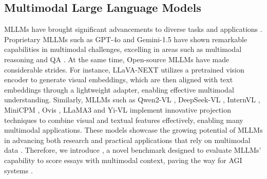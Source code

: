 \subsection{Multimodal Large Language Models}
MLLMs have brought significant advancements to diverse tasks and applications \cite{xi2023rise,huo2024mmneuron,yan2024urbanclip,yan2024georeasoner,zou2025deep,dang2024explainable}. Proprietary MLLMs such as GPT-4o \cite{openai2024gpt4ocard} and Gemini-1.5 \cite{gemini} have shown remarkable capabilities in multimodal challenges, excelling in areas such as multimodal reasoning and QA \cite{chang2024survey,yan2024errorradar,yan2024survey,zheng2024reefknot,yan2025position}. At the same time, Open-source MLLMs have made considerable strides. For instance, LLaVA-NEXT \cite{liu2024llavanext} utilizes a pretrained vision encoder to generate visual embeddings, which are then aligned with text embeddings through a lightweight adapter, enabling effective multimodal understanding. Similarly, MLLMs such as Qwen2-VL \cite{qwen2vl}, DeepSeek-VL \cite{lu2024deepseek}, InternVL \cite{internvl2,internvl2.5}, MiniCPM \cite{hu2024minicpmunveilingpotentialsmall}, Ovis \cite{lu2024ovisstructuralembeddingalignment}, LLaMA3 \cite{grattafiori2024llama3herdmodels} and Yi-VL \cite{young2024yi} implement innovative projection techniques to combine visual and textual features effectively, enabling many multimodal applications. These models showcase the growing potential of MLLMs in advancing both research and practical applications that rely on multimodal data \cite{qu2025tool,zou2024look,zhou2024mitigating,huang2024miner}. Therefore, we introduce \dataset, a novel benchmark designed to evaluate MLLMs’ capability to score essays with multimodal context, paving the way for AGI systems \cite{xiao2024automation,tate2024can,yan2024practical}.
\vspace{-2mm}